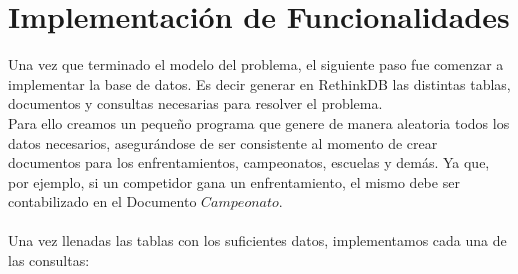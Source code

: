 \section{Implementación  de Funcionalidades}

Una vez que terminado el modelo del problema, el siguiente paso fue comenzar a implementar la base de datos. Es decir generar en RethinkDB las distintas tablas, documentos y consultas necesarias para resolver el problema.\\

Para ello creamos un pequeño programa que genere de manera aleatoria todos los datos necesarios, asegurándose de ser consistente al momento de crear documentos para los enfrentamientos, campeonatos, escuelas y demás. Ya que, por ejemplo, si un competidor gana un enfrentamiento, el mismo debe ser contabilizado en el Documento $Campeonato$.\\ \\

Una vez llenadas las tablas con los suficientes datos, implementamos cada una de las consultas:\\ \\

